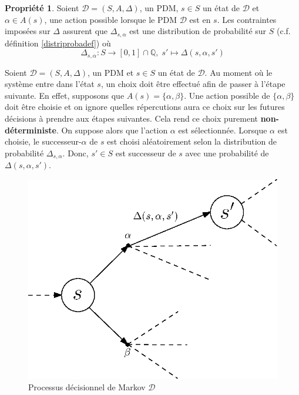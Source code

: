 \documentclass[12pt,a4paper]{report}
\theoremstyle{definition}%
\newtheorem{propriete}{Propriété}[chapter]
\theoremstyle{remark}
\newcommand{\cf}{c.f. }
\begin{document}
\begin{propriete}
	Soient $\mathcal{D} = (S, A, \Delta)$, un PDM, $s \in S$ un état de $\mathcal{D}$ et $\alpha \in A(s)$, une action possible lorsque le PDM $\mathcal{D}$ est en $s$. Les contraintes imposées sur $\Delta$ assurent que $\Delta_{s, \alpha}$ est une distribution de probabilité sur $S$ (\cf définition \ref{distriprobadef}) où
	\[
		\Delta_{s, \alpha} : S \rightarrow [0, 1] \cap \mathbb{Q}, \; s' \mapsto \Delta(s, \alpha, s')
	\]
\end{propriete}

Soient $\mathcal{D} = (S, A, \Delta)$, un PDM et $s \in S$ un état de $\mathcal{D}$. Au moment où le système entre dans l'état $s$, un choix doit être effectué afin de passer à l'étape suivante. En effet, supposons que $A(s) = \{\alpha, \beta\}$. Une action possible de $\{\alpha, \beta \}$ doit être choisie et on ignore quelles répercutions aura ce choix sur les futures décisions à prendre aux étapes suivantes. Cela rend ce choix purement \textbf{non-déterministe}. On suppose alors que l'action $\alpha$ est sélectionnée. Lorsque $\alpha$ est choisie, le successeur-$\alpha$ de $s$ est choisi aléatoirement selon la distribution de probabilité $\Delta_{s, \alpha}$. Donc, $s' \in S$ est successeur de $s$ avec une probabilité de $\Delta(s, \alpha, s')$.

\begin{figure}
	\centering
	\includegraphics[scale=0.7]{figures/PDM-intuition.eps}
	\caption{Processus décisionnel de Markov $\mathcal{D}$}
\end{figure}
\end{document}
